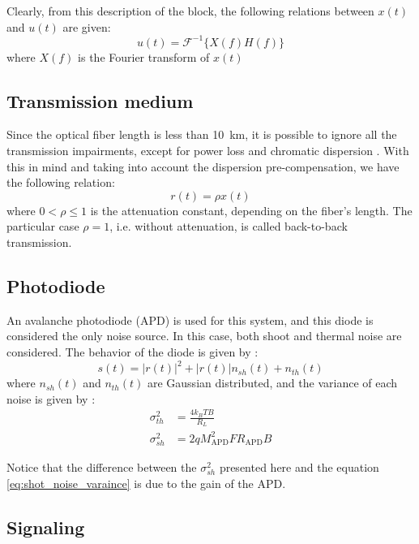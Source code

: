 Clearly, from this description of the block, the following relations between $x(t)$ and $u(t)$ are given:
\begin{equation}
	u(t)=\mathcal{F}^{-1}\bigl\{X(f)H(f)\bigr\}
	\label{eq:Tuey_Disp_precomp}
\end{equation}
where $X(f)$ is the Fourier transform of $x(t)$


\subsection{Transmission medium}

Since the optical fiber length is less than \SI{10}{\km}, it is possible to ignore all the transmission impairments, except for power loss and chromatic dispersion \cite{Tasbihi_Tukey}. With this in mind and taking into account the dispersion pre-compensation, we have the following relation:
\begin{equation}
r(t)=\rho x(t)
\label{eq:Tukey_fiber_out}
\end{equation}
 where $0<\rho\leq1$ is the attenuation constant, depending on the fiber's length. The particular case $\rho=1$, i.e. without attenuation, is called back-to-back transmission.

\subsection{Photodiode}

An avalanche photodiode (APD) is used for this system, and this diode is considered the only noise source. In this case, both shoot and thermal noise are considered. The behavior of  the diode is given by \cite{Tasbihi_Tukey}:
\begin{equation}
s(t)=\bigl|r(t)\bigr|^2+\bigl|r(t)\bigr|n_{sh}(t)+n_{th}(t)
\label{eq:Tukey_PD}
\end{equation}
where $n_{sh}(t)$ and $n_{th}(t)$ are Gaussian distributed, and the variance of each noise is given by \cite{Tasbihi_Tukey}:
\begin{align}
	\sigma^2_{th}&=\frac{4k_BTB}{R_L}\\
	\sigma^2_{sh}&=2qM^2_{\text{APD}}FR_\text{APD}B
\end{align}

Notice that the difference between the $\sigma^2_{sh}$ presented here and the equation \ref{eq:shot_noise_varaince} is due to the gain of the APD.

\subsection{Signaling}

